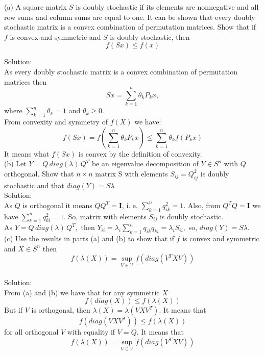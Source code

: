 \documentclass{article}
\begin{document}
 (a) A square matrix $S$ is doubly stochastic if its elements are nonnegative and all row sums and
 column sums are equal to one. It can be shown that every doubly stochastic matrix is a convex
 combination of permutation matrices.
 Show that if $f$ is convex and symmetric and $S$ is doubly stochastic, then
 $$f(Sx) \leq f(x)$$
 
 Solution: \\
 
 As every doubly stochastic matrix is a convex
 combination of permutation matrices then 
  $$Sx = \sum_{k = 1}^{n} \theta_k P_k x, $$ 
  where $\sum_{k = 1}^{n}\theta_k = 1$ and 
  $\theta_k \geq 0.$ \\
  From convexity and symmetry of $f(X)$ we have: \\
  
  $$f(Sx) = f(\sum_{k = 1}^{n} \theta_k P_k x) \leq  \sum_{k = 1}^{n} \theta_k f(P_k x)$$ 
  It means what $f(Sx)$ is convex by the definition of convexity. \\
  
  (b) Let $Y = Q \, diag(\lambda) \, Q^T$ be an eigenvalue decomposition of $Y \in S^n$ with $Q$ orthogonal. Show that $n \times n$ matrix S with elements $S_{ij} = Q^2_{ij}$ is doubly stochastic and that $diag(Y) = S \lambda$ \\
  
  Solution: \\
  As $Q$ is orthogonal it means $ QQ^T = \boldsymbol{I}$, i. e. $\sum_{k = 1}^{n}q_{ik}^2 = 1.$ Also, from $ Q^TQ = \boldsymbol{I}$ we have $\sum_{k = 1}^{n}q_{ki}^2 = 1.$ So, matrix with elements $S_{ij}$ is doubly stochastic. \\
  As $Y = Q \, diag(\lambda) \, Q^T,$ then $Y_{ii} = \lambda_i \sum_{k = 1}^{n}q_{ik}q_{ki} = \lambda_i S_{ii},$ so, $diag(Y) = S \lambda.$ \\
  
  (c) Use the results in parts (a) and (b) to show that if $f$ is convex and symmetric and $X \in S^n$ then 
  $$f(\lambda(X)) = \sup_{V \in \mathcal{V}} f(diag(V^TXV))$$ \\
  
  Solution: \\
  
  From (a) and (b) we have that for any symmetric $X$ 
  $$f(diag(X)) \leq f(\lambda(X))$$
  But if $V$ is orthogonal, then 
  $\lambda(X) = \lambda(VXV^T).$ It means that
$$f(diag(VXV^T)) \leq f(\lambda(X)) $$ for all orthogonal $V$ with equality if $V = Q.$ It means that 
$$f(\lambda(X)) = \sup_{V \in \mathcal{V}} f(diag(V^TXV))$$
\end{document}
